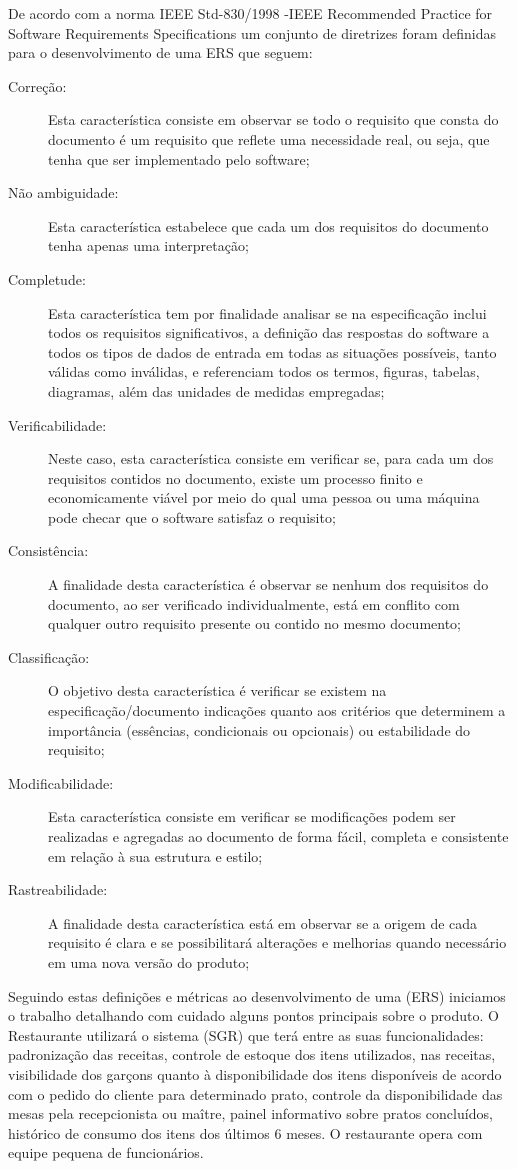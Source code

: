 De acordo com a norma IEEE Std-830/1998 -IEEE Recommended Practice for Software Requirements Specifications \cite{IEEE830-1998} um conjunto de diretrizes foram definidas para o desenvolvimento de uma ERS que seguem:
\begin{description}
\item [Correção:] Esta característica consiste em observar se todo o requisito que consta do documento é um requisito que reflete uma necessidade real, ou seja, que tenha que ser implementado pelo software;
\item [Não ambiguidade:] Esta característica estabelece que cada um dos requisitos do documento tenha apenas uma interpretação; 
\item [Completude:] Esta característica tem por finalidade analisar se na especificação inclui todos os requisitos significativos, a definição das respostas do software a todos os tipos de dados de entrada em todas as situações possíveis, tanto válidas como inválidas, e referenciam todos os termos, figuras, tabelas, diagramas, além das unidades de medidas empregadas; 
\item[Verificabilidade:] Neste caso, esta característica consiste em verificar se, para cada um dos requisitos contidos no documento, existe um processo finito e economicamente viável por meio do qual uma pessoa ou uma máquina pode checar que o software satisfaz o requisito; 
\item[Consistência:] A finalidade desta característica é observar se nenhum dos requisitos do documento, ao ser verificado individualmente, está em conflito com qualquer outro requisito presente ou contido no mesmo documento; 
\item[Classificação:] O objetivo desta característica é verificar se existem na especificação/documento indicações quanto aos critérios que determinem a importância (essências, condicionais ou opcionais) ou estabilidade do requisito; 
\item[Modificabilidade:] Esta característica consiste em verificar se modificações podem ser realizadas e agregadas ao documento de forma fácil, completa e consistente em relação à  sua estrutura e estilo; 
\item[Rastreabilidade:] A finalidade desta característica está em observar se a origem de cada requisito é clara e se possibilitará alterações e melhorias quando necessário em uma nova versão do produto;
\end{description}

Seguindo estas definições e métricas ao desenvolvimento de uma (ERS) iniciamos o trabalho detalhando com cuidado alguns pontos principais sobre o produto. O Restaurante utilizará o sistema (SGR) que terá entre as suas funcionalidades: padronização das receitas, controle de estoque dos itens utilizados, nas receitas, visibilidade dos garçons quanto à disponibilidade dos itens disponíveis de acordo com o pedido do cliente para determinado prato, controle da disponibilidade das mesas pela recepcionista ou maître, painel informativo sobre pratos concluídos, histórico de consumo dos itens dos últimos 6 meses. O restaurante opera com equipe pequena de funcionários.


